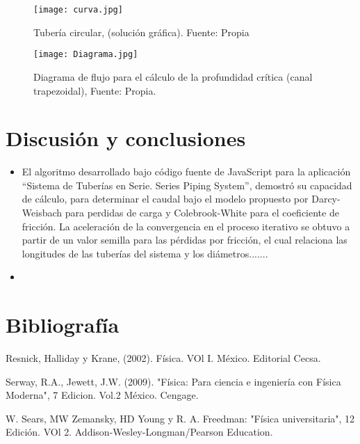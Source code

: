 \documentclass[10pt,journal]{IEEEtran}
\begin{document}
\begin{figure}[!ht]
\begin {center}
\texttt{[image: curva.jpg]}
\caption{Tubería circular, (solución gráfica). Fuente: Propia}
\end {center}
\end{figure}

 

 


 


\begin{figure}[!ht]
\begin {center}
\texttt{[image: Diagrama.jpg]}
\caption{Diagrama de flujo para el cálculo de la profundidad crítica (canal trapezoidal), Fuente: Propia.}
\end {center}
\end{figure}




\section{Discusión y conclusiones}
\begin{itemize}
\item 

El algoritmo desarrollado bajo código fuente de JavaScript para la aplicación “Sistema de Tuberías en Serie. Series Piping System”, demostró su capacidad de cálculo, para determinar el caudal bajo el modelo propuesto por Darcy-Weisbach para perdidas de carga y Colebrook-White para el coeficiente de fricción. La aceleración de la convergencia en el proceso iterativo se obtuvo a partir de un valor semilla para las pérdidas por fricción, el cual relaciona las longitudes de las tuberías del sistema y los diámetros.......

\item 
\end{itemize}






\section{Bibliografía}


Resnick, Halliday y Krane, (2002). Física. VOl I. México. Editorial Cecsa.


Serway, R.A., Jewett, J.W. (2009). "Física: Para ciencia e ingeniería con Física Moderna", 7 Edicion. Vol.2 México. Cengage.


W. Sears, MW Zemansky, HD Young y R. A. Freedman: "Física universitaria", 12 Edición. VOl 2. Addison-Wesley-Longman/Pearson Education.
\end{document}

